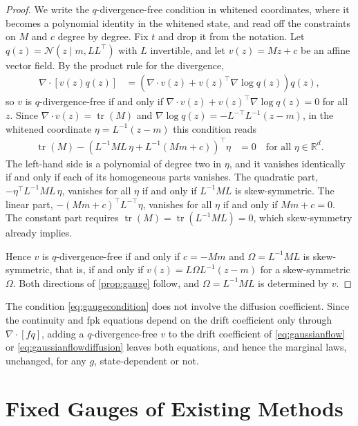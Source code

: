 \documentclass{article} %
\newcommand{\postdrift}{f}
\newcommand{\vol}{g}
\newcommand{\gauge}{\Omega}
\newcommand{\tr}{\operatorname{tr}}
\newcommand{\Norm}{\mathcal{N}}
\newcommand{\reals}{\mathbb{R}}
\begin{document}
\begin{proof}
We write the $q$-divergence-free condition in whitened coordinates, where it becomes a polynomial identity in the whitened state, and read off the constraints on $M$ and $c$ degree by degree. Fix $t$ and drop it from the notation. Let $q(z) = \Norm(z \mid m, L L^\top)$ with $L$ invertible, and let $v(z) = M z + c$ be an affine vector field. By the product rule for the divergence,
\begin{align*}
    \nabla \cdot [v(z) q(z)] &= \left(\nabla \cdot v(z) + v(z)^\top \nabla \log q(z)\right) q(z),
\end{align*}
so $v$ is $q$-divergence-free if and only if $\nabla \cdot v(z) + v(z)^\top \nabla \log q(z) = 0$ for all $z$. Since $\nabla \cdot v(z) = \tr(M)$ and $\nabla \log q(z) = -L^{-\top} L^{-1}(z - m)$, in the whitened coordinate $\eta = L^{-1}(z - m)$ this condition reads
\begin{align}
    \tr(M) - \left(L^{-1} M L \, \eta + L^{-1}(M m + c)\right)^\top \eta &= 0 \quad \text{for all } \eta \in \reals^d. \label{eq:gaugecondition}
\end{align}
The left-hand side is a polynomial of degree two in $\eta$, and it vanishes identically if and only if each of its homogeneous parts vanishes. The quadratic part, $-\eta^\top L^{-1} M L \, \eta$, vanishes for all $\eta$ if and only if $L^{-1} M L$ is skew-symmetric. The linear part, $-(M m + c)^\top L^{-\top} \eta$, vanishes for all $\eta$ if and only if $M m + c = 0$. The constant part requires $\tr(M) = \tr(L^{-1} M L) = 0$, which skew-symmetry already implies.

Hence $v$ is $q$-divergence-free if and only if $c = -M m$ and $\gauge = L^{-1} M L$ is skew-symmetric, that is, if and only if $v(z) = L \gauge L^{-1}(z - m)$ for a skew-symmetric $\gauge$. Both directions of \cref{prop:gauge} follow, and $\gauge = L^{-1} M L$ is determined by $v$.
\end{proof}

The condition \cref{eq:gaugecondition} does not involve the diffusion coefficient. Since the continuity and \gls{fpk} equations depend on the drift coefficient only through $\nabla \cdot [\postdrift q]$, adding a $q$-divergence-free $v$ to the drift coefficient of \cref{eq:gaussianflow} or \cref{eq:gaussianflowdiffusion} leaves both equations, and hence the marginal laws, unchanged, for any $\vol$, state-dependent or not.

\section{Fixed Gauges of Existing Methods}\label{sec:fixedgauges}
\end{document}
